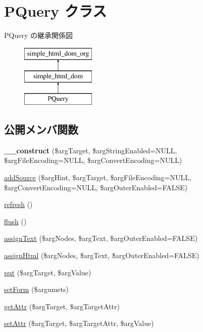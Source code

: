 \hypertarget{class_p_query}{}\section{P\+Query クラス}
\label{class_p_query}
P\+Query の継承関係図\begin{figure}[H]
\begin{center}
\leavevmode
\includegraphics[height=3.000000cm]{class_p_query}
\end{center}
\end{figure}
\subsection*{公開メンバ関数}
\begin{DoxyCompactItemize}
\item 
\hypertarget{class_p_query_a6d032ac38c617a86c7e8e6b40b8fd7ed}{}{\bfseries \+\_\+\+\_\+construct} (\$arg\+Target, \$arg\+String\+Enabled=N\+U\+L\+L, \$arg\+File\+Encoding=N\+U\+L\+L, \$arg\+Convert\+Encoding=N\+U\+L\+L)\label{class_p_query_a6d032ac38c617a86c7e8e6b40b8fd7ed}

\item 
\hyperlink{class_p_query_a9a4359416363f682c92fda62c43babda}{add\+Source} (\$arg\+Hint, \$arg\+Target, \$arg\+File\+Encoding=N\+U\+L\+L, \$arg\+Convert\+Encoding=N\+U\+L\+L, \$arg\+Outer\+Enabled=F\+A\+L\+S\+E)
\item 
\hyperlink{class_p_query_a276c00b5befedae7349d0945f5d6ba28}{refresh} ()
\item 
\hyperlink{class_p_query_acd073383bc3c77f25fc52d1caa7389a9}{flush} ()
\item 
\hyperlink{class_p_query_aa9307a2df5e2c760c7b15fb2ad7e2fbd}{assign\+Text} (\$arg\+Nodes, \$arg\+Text, \$arg\+Outer\+Enabled=F\+A\+L\+S\+E)
\item 
\hyperlink{class_p_query_a14104b2c5b7368417e81539d9c571693}{assign\+Html} (\$arg\+Nodes, \$arg\+Text, \$arg\+Outer\+Enabled=F\+A\+L\+S\+E)
\item 
\hyperlink{class_p_query_a37cb8439c38a831553457b3ce7c8846a}{put} (\$arg\+Target, \$arg\+Value)
\item 
\hyperlink{class_p_query_a09255b571a9b0aade9de1acbe0850864}{set\+Form} (\$argumets)
\item 
\hyperlink{class_p_query_a25f666ee0150463eced87debad60ef93}{get\+Attr} (\$arg\+Target, \$arg\+Target\+Attr)
\item 
\hyperlink{class_p_query_a34ad0dca40dd24dea9f88c608a5cb149}{set\+Attr} (\$arg\+Target, \$arg\+Target\+Attr, \$arg\+Value)
\end{DoxyCompactItemize}
